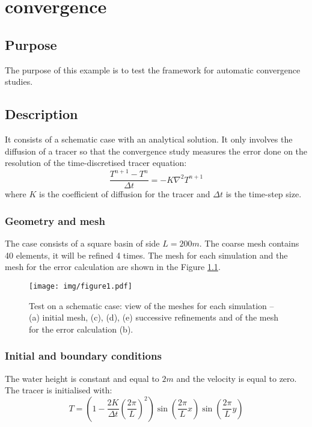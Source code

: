 \chapter{convergence}

\section{Purpose}
The purpose of this example is to test the framework for automatic 
convergence studies.

\section{Description}
It consists of a schematic case with an analytical solution. 
It only involves the diffusion of a tracer so that the convergence study
measures the error done on the resolution of the time-discretised 
tracer equation:
\begin{equation}
\dfrac{T^{n+1} - T^{n}}{\Delta t} = -K \nabla^2 T^{n+1}
\end{equation}
where $K$ is the coefficient of diffusion for the tracer 
and $\Delta t$ is the time-step size.

\subsection{Geometry and mesh}
The case consists of a square basin of side $L=200m$. 
The coarse mesh contains 40 elements, it will be refined 4 times.
The mesh for each simulation and the mesh for
the error calculation are shown in the Figure \ref{fig:figure1}.

\begin{figure}
  \begin{center}
    \texttt{[image: img/figure1.pdf]}
    \caption{Test on a schematic case: view of the meshes for each simulation
    -- (a) initial mesh, (c), (d), (e) successive refinements and 
    of the mesh for the error calculation (b).}
    \label{fig:figure1}
  \end{center}
\end{figure}

\subsection{Initial and boundary conditions}
The water height is constant and equal to $2m$ and the velocity 
is equal to zero.
The tracer is initialised with:
\begin{equation}
T = \left(1 - \dfrac{2 K}{\Delta t}\left(\dfrac{2 \pi}{L}\right)^2 \right)
\sin \left(\dfrac{2 \pi}{L}x \right) 
\sin \left( \dfrac{2 \pi}{L}y\right)
\end{equation}

